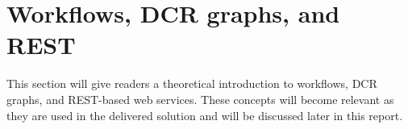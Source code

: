 \section{Workflows, DCR graphs, and REST}
This section will give readers a theoretical introduction to workflows, DCR graphs, and REST-based web services. These concepts will become relevant as they are used in the delivered solution and will be discussed later in this report.  






